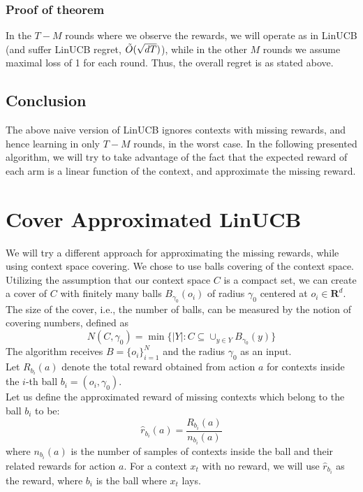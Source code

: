 \documentclass{article}
\begin{document}
\subsubsection{Proof of theorem}
In the $T-M$ rounds where we observe the rewards, we will operate as in LinUCB (and suffer LinUCB regret, $\Tilde{O} (\sqrt{dT})$), while in the other $M$ rounds we assume maximal loss of 1 for each round. Thus, the overall regret is as stated above.

\subsection{Conclusion}
The above naive version of LinUCB ignores contexts with missing rewards, and hence learning in only $T-M$ rounds, in the worst case. In the following presented algorithm, we will try to take advantage of the fact that the expected reward of each arm is a linear function of the context, and approximate the missing reward.

\section{Cover Approximated LinUCB}

We will try a different approach for approximating the missing rewards, while using context space covering.
We chose to use balls covering of the context space.\\
Utilizing the assumption that our context space $C$ is a compact set, we can create a cover of $C$ with finitely many balls $B_{\gamma_0}(o_i)$ of radius $\gamma_0$ centered at $o_i \in \mathbf{R}^d$.
The size of the cover, i.e., the number of balls, can be measured by the notion of covering numbers, defined as
$$ N(C,\gamma_0) = \min\{|Y|: C \subseteq \cup_{y \in Y} B_{\gamma_0}(y)\} $$
The algorithm receives $B=\{o_i\}_{i=1}^N$ and the radius $\gamma_0$ as an input.\\

Let $R_{b_i}(a)$ denote the total reward obtained from action $a$ for contexts inside the $i$-th ball $b_i=(o_i,\gamma_0)$.\\
Let us define the approximated reward of missing contexts which belong to the ball $b_i$ to be:
$$ \hat{r}_{b_i}(a) = \frac{R_{b_i}(a)}{n_{b_i}(a)}$$
where $n_{b_i}(a)$ is the number of samples of contexts inside the ball and their related rewards for action $a$.
For a context $x_t$ with no reward, we will use $\hat{r}_{b_i}$ as the reward, where $b_i$ is the ball where $x_t$ lays.\\
\end{document}
